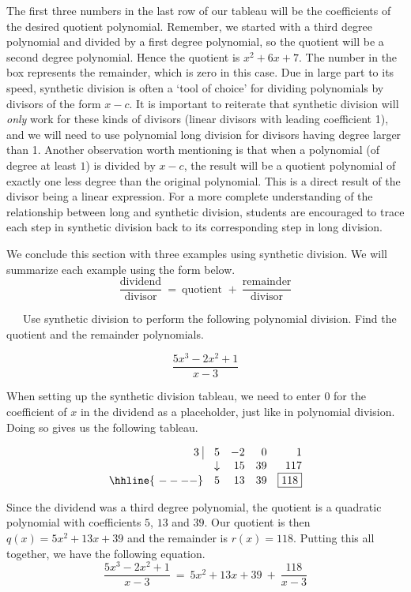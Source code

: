 The first three numbers in the last row of our tableau will be the coefficients of the desired quotient polynomial.  Remember, we started with a third degree polynomial and divided by a first degree polynomial, so the quotient will be a second degree polynomial.  Hence the quotient is $x^2+6x+7$.  The number in the box represents the remainder, which is zero in this case.\pp
Due in large part to its speed, synthetic division is often a `tool of choice' for dividing polynomials by divisors of the form $x-c$.  It is important to reiterate that synthetic division will \emph{only} work for these kinds of divisors (linear divisors with leading coefficient 1), and we will need to use polynomial long division for divisors having degree larger than 1.\pp
Another observation worth mentioning is that when a polynomial (of degree at least $1$) is divided by $x-c$, the result will be a quotient polynomial of exactly one less degree than the original polynomial.  This is a direct result of the divisor being a linear expression.\pp
For a more complete understanding of the relationship between long and synthetic division, students are encouraged to trace each step in synthetic division back to its corresponding step in long division.\pp

We conclude this section with three examples using synthetic division.  We will summarize each example using the form below.
$$\frac{\text{dividend}}{\text{divisor}}~=~\text{quotient~}+~\frac{\text{remainder}}{\text{divisor}}$$

\begin{example}~~~Use synthetic division to perform the following polynomial division.  Find the quotient and the remainder polynomials.

$$\frac{5x^3 - 2x^2 + 1}{x-3}$$

When setting up the synthetic division tableau, we need to enter $0$ for the coefficient of $x$ in the dividend as a placeholder, just like in polynomial division.  Doing so gives us the following tableau.


\[ \begin{array}{rrrrr}


  3 \, \, \vline& 5 & -2 & 0  & 1 \\

   & \downarrow &  15  &  39  & 117 \\ \hhline{~----} 
  & 5  &   13  & 39  &  \fbox{$118$}  \\  
\end{array}\]

Since the dividend was a third degree polynomial, the quotient is a quadratic polynomial with coefficients $5$, $13$ and $39$.  Our quotient is then\\
$q(x) = 5x^2+13x+39$ and the remainder is $r(x) = 118$.\pp
Putting this all together, we have the following equation.
$$\frac{5x^3 - 2x^2 + 1}{x-3}~=~5x^2+13x+39~+~\frac{118}{x-3}$$
\end{example}

